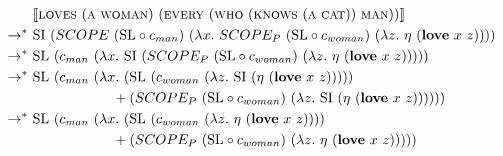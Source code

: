 \begin{align*}
  & \sem{\abs{loves}\ (\abs{a}\ \abs{woman})\ (\abs{every}\ (\abs{who}\ (\abs{knows}\ (\abs{a}\ \abs{cat}))\ \abs{man}))} \\
  \rightarrow^*\ & \mathrm{SI}\ (SCOPE\ (\mathrm{SL} \circ c_{man})\ 
  (\lambda x.\ SCOPE_P\ (\mathrm{SL} \circ c_{woman})\
  (\lambda z.\ \eta\ (\obj{love}\ x\ z)))) \\
  \rightarrow^*\ & \mathrm{SL}\ (c_{man}\ 
  (\lambda x.\ \mathrm{SI}\ (SCOPE_P\ (\mathrm{SL} \circ c_{woman})\
  (\lambda z.\ \eta\ (\obj{love}\ x\ z))))) \\
  \rightarrow^*\ & \mathrm{SL}\ (c_{man}\ 
  (\lambda x.\ (\mathrm{SL}\ (c_{woman}\ (\lambda
  z.\ \mathrm{SI}\ (\eta\ (\obj{love}\ x\ z))))) \\
  & \hspace{20mm} + (SCOPE_P\ (\mathrm{SL} \circ c_{woman})\
  (\lambda z.\ \mathrm{SI}\ (\eta\ (\obj{love}\ x\ z)))))) \\
  \rightarrow^*\ & \mathrm{SL}\ (c_{man}\ 
  (\lambda x.\ (\mathrm{SL}\ (c_{woman}\ (\lambda
  z.\ \eta\ (\obj{love}\ x\ z)))) \\
  & \hspace{20mm} + (SCOPE_P\ (\mathrm{SL} \circ c_{woman})\
  (\lambda z.\ \eta\ (\obj{love}\ x\ z))))) \\
\end{align*}
